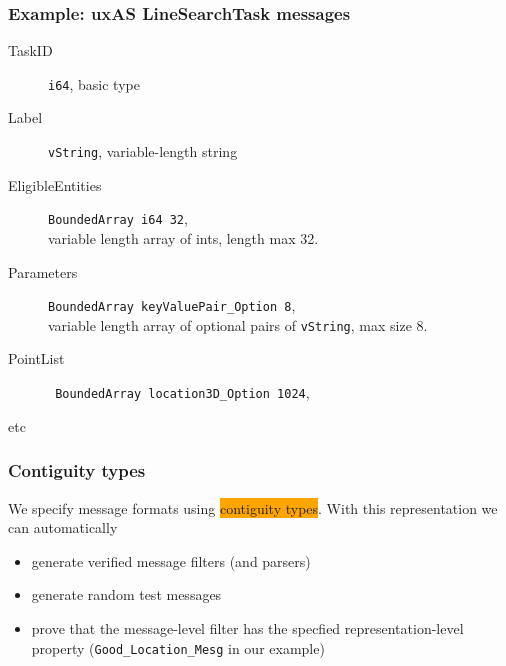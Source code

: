 \documentclass{beamer}
\newcommand{\kemph}[1]{\colorbox{orange}{#1}}
\begin{document}
\begin{frame}[fragile]\frametitle{Example: uxAS LineSearchTask messages}

\begin{description}

  \item [TaskID] \verb+i64+, basic type

  \item [Label] \verb+vString+, variable-length string

  \item [EligibleEntities] \verb+BoundedArray i64 32+, \\
    variable length array of ints, length max 32.

  \item [Parameters] \verb+BoundedArray keyValuePair_Option 8+, \\
variable length array of optional pairs of \verb+vString+, max size 8.

  \item [PointList] \verb+ BoundedArray location3D_Option 1024+, \\

  \item [etc]
\end{description}

\end{frame}

\begin{frame}[fragile]\frametitle{Contiguity types}

We specify message formats using \kemph{contiguity types}. With this
representation we can automatically

\begin{itemize}
\item generate verified message filters (and parsers)

\item generate random test messages

\item prove that the message-level filter has the specfied representation-level property
  (\verb+Good_Location_Mesg+ in our example)

\end{itemize}



\end{frame}
\end{document}

